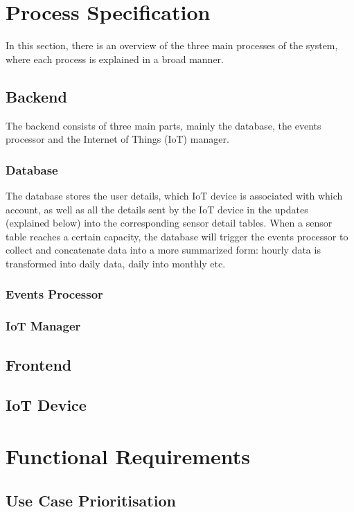 \documentclass{article}
\begin{document}
\section{Process Specification}
	In this section, there is an overview of the three main processes of the system, where each process is explained in a broad manner.
	
	\subsection{Backend}
		The backend consists of three main parts, mainly the database, the events processor and the Internet of Things (IoT) manager.
		
		\subsubsection{Database}
			The database stores the user details, which IoT device is associated with which account, as well as all the details sent by the IoT device in the updates (explained below) into the corresponding sensor detail tables. When a sensor table reaches a certain capacity, the database will trigger the events processor to collect and concatenate data into a more summarized form: hourly data is transformed into daily data, daily into monthly etc.
		
		\subsubsection{Events Processor}
		
		\subsubsection{IoT Manager}
		
	\subsection{Frontend}
		
	
	\subsection{IoT Device}

\section{Functional Requirements}
	\subsection{Use Case Prioritisation}
\end{document}
